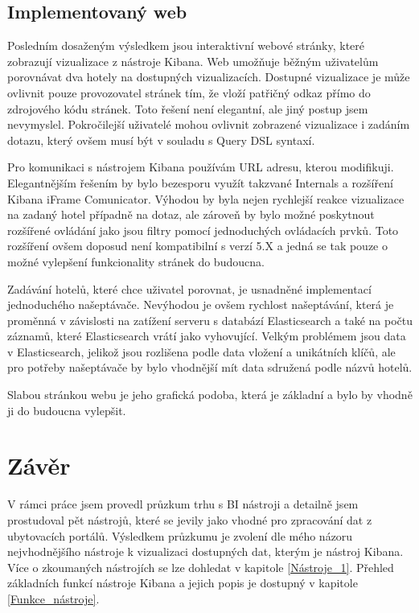 \documentclass[czech,BP]{thesiskiv}
\begin{document}
\section{Implementovaný web}
Posledním dosaženým výsledkem jsou interaktivní webové stránky, které zobrazují vizualizace z nástroje Kibana. Web umožňuje běžným uživatelům porovnávat dva hotely na dostupných vizualizacích. Dostupné vizualizace je může ovlivnit pouze provozovatel stránek tím, že vloží patřičný odkaz přímo do zdrojového kódu stránek. Toto řešení není elegantní, ale jiný postup jsem nevymyslel. Pokročilejší uživatelé mohou ovlivnit zobrazené vizualizace i zadáním dotazu, který ovšem musí být v souladu s Query DSL syntaxí.


Pro komunikaci s nástrojem Kibana používám URL adresu, kterou modifikuji. Elegantnějším řešením by bylo bezesporu využít takzvané Internals a rozšíření Kibana iFrame Comunicator. Výhodou by byla nejen rychlejší reakce vizualizace na zadaný hotel případně na dotaz, ale zároveň by bylo možné poskytnout rozšířené ovládání jako jsou filtry pomocí jednoduchých ovládacích prvků. Toto rozšíření ovšem doposud není kompatibilní s verzí 5.X a jedná se tak pouze o možné vylepšení funkcionality stránek do budoucna.


Zadávání hotelů, které chce uživatel porovnat, je usnadněné implementací jednoduchého našeptávače. Nevýhodou je ovšem rychlost našeptávání, která je proměnná v závislosti na zatížení serveru s databází Elasticsearch a také na počtu záznamů, které Elasticsearch vrátí jako vyhovující. Velkým problémem jsou data v Elasticsearch, jelikož jsou rozlišena podle data vložení a unikátních klíčů, ale pro potřeby našeptávače by bylo vhodnější mít data sdružená podle názvů hotelů.


Slabou stránkou webu je jeho grafická podoba, která je základní a  bylo by vhodně ji do budoucna vylepšit.

\chapter{Závěr}
\label{závěr}
V rámci práce jsem provedl průzkum trhu s BI nástroji a detailně jsem prostudoval pět nástrojů, které se jevily jako vhodné pro zpracování dat z ubytovacích portálů. Výsledkem průzkumu je zvolení dle mého názoru nejvhodnějšího nástroje k vizualizaci dostupných dat, kterým je nástroj Kibana. Více o zkoumaných nástrojích se lze dohledat v kapitole \ref{Nástroje_1}. Přehled základních funkcí nástroje Kibana a jejich popis je dostupný v kapitole \ref{Funkce_nástroje}.
\end{document}
